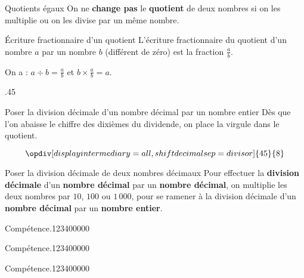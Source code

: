\begin{pageCours}
{\begin{PpT}{Quotients égaux}
On ne \textbf{change pas} le \textbf{quotient} de deux nombres si on les multiplie ou on les divise par un même nombre.
\end{PpT}

\begin{DefT}{Écriture fractionnaire d'un quotient}
L'écriture fractionnaire du quotient d'un nombre $a$ par un nombre $b$ (différent de zéro) est la fraction $\frac{a}{b}$.

On a : $a\div b=\frac{a}{b}$ et $b\times\frac{a}{b}=a$.
\end{DefT}
}{.45\linewidth}{
\begin{MtT}{Poser la division décimale d'un nombre décimal par un nombre entier}
Dès que l'on abaisse le chiffre des dixièmes du dividende, on place la virgule dans le quotient.

\[\opdiv[displayintermediary=all,shiftdecimalsep=divisor]{45}{8}\]
\end{MtT}

\begin{MtT}{Poser la division décimale de deux nombres décimaux}
Pour effectuer la \textbf{division décimale} d'un \textbf{nombre décimal} par un \textbf{nombre décimal}, on multiplie les deux nombres par $10$, $100$ ou $1\,000$, pour se ramener à la division décimale d'un \textbf{nombre décimal} par un \textbf{nombre entier}.
\end{MtT}
}


\end{pageCours} %


\begin{pageAD}  %
\restoregeometry %


\begin{ExoCad}{Compétence.}{1234}{0}{0}{0}{0}{0}

\end{ExoCad}


\begin{ExoCad}{Compétence.}{1234}{0}{0}{0}{0}{0}

\end{ExoCad}


\begin{ExoCad}{Compétence.}{1234}{0}{0}{0}{0}{0}

\end{ExoCad}
 
\end{pageAD} %


